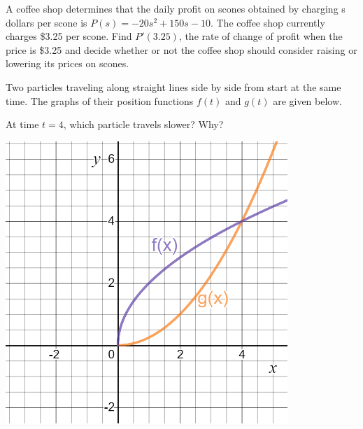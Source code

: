 \begin{exercise}
  A coffee shop determines that the daily profit on scones obtained by charging s dollars per scone is  $P(s)=-20s^2+150s-10$. The coffee shop currently charges  \$3.25  per scone. Find  $P'(3.25)$, the rate of change of profit when the price is  \$3.25  and decide whether or not the coffee shop should consider raising or lowering its prices on scones.
\end{exercise}
\vspace*{6\baselineskip}

\begin{exercise}
Two particles traveling along straight lines side by side from start at
the same time. The graphs of their position functions \(f(t)\) and
\(g(t)\) are given below.

At time \(t=4\), which particle travels slower? Why?

\includegraphics[width=0.8\textwidth]{img/desmos-two-functions.png}

\end{exercise}

